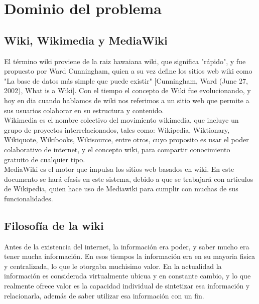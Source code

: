 
\iffalse  \fi

\section{Dominio del problema}
    \subsection{Wiki, Wikimedia y MediaWiki}

        El término wiki proviene de la raiz hawaiana wiki, que significa "rápido", y fue propuesto por Ward Cunningham, quien a su vez define los sitios web wiki como "La base de datos más simple que puede existir" [Cunningham, Ward (June 27, 2002), What is a Wiki]. Con el tiempo el concepto de Wiki fue evolucionando, y hoy en dia cuando hablamos de wiki nos referimos a un sitio web que permite a sus usuarios colaborar en su estructura y contenido.\\
        
        Wikimedia es el nombre colectivo del movimiento wikimedia, que incluye un grupo de proyectos interrelacionados, tales como: Wikipedia, Wiktionary, Wikiquote, Wikibooks, Wikisource, entre otros, cuyo proposito es usar el poder colaborativo de internet, y el concepto wiki, para compartir conocimiento gratuito de cualquier tipo.\\
        
        MediaWiki es el motor que impulsa los sitios web basados en wiki. En este documento se hará efasis en este sistema, debido a que se trabajará con articulos de Wikipedia, quien hace uso de Mediawiki para cumplir con muchas de sus funcionalidades.

    \subsection{Filosofía de la wiki}

        \iffalse  \fi
        
        Antes de la existencia del internet, la información era poder, y saber mucho era tener mucha información. En esos tiempos la información era en su mayoria fisica y centralizada, lo que le otorgaba muchisimo valor. En la actualidad la información es considerada virtualmente ubicua y en constante cambio, y lo que realmente ofrece valor es la capacidad individual de sintetizar esa información y relacionarla, además de saber utilizar esa información con un fin.\\

